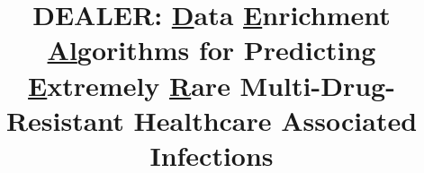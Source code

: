 \documentclass{NSF}
\begin{document}

\title{DEALER: \underline{D}ata \underline{E}nrichment \underline{Al}gorithms for Predicting \underline{E}xtremely \underline{R}are Multi-Drug-Resistant Healthcare Associated Infections}



\newpage{}


\newpage{}
\renewcommand\refname{References Cited}



\newpage{}


\newpage{}


\newpage{}


\newpage{}


\newpage{}
\end{document}
